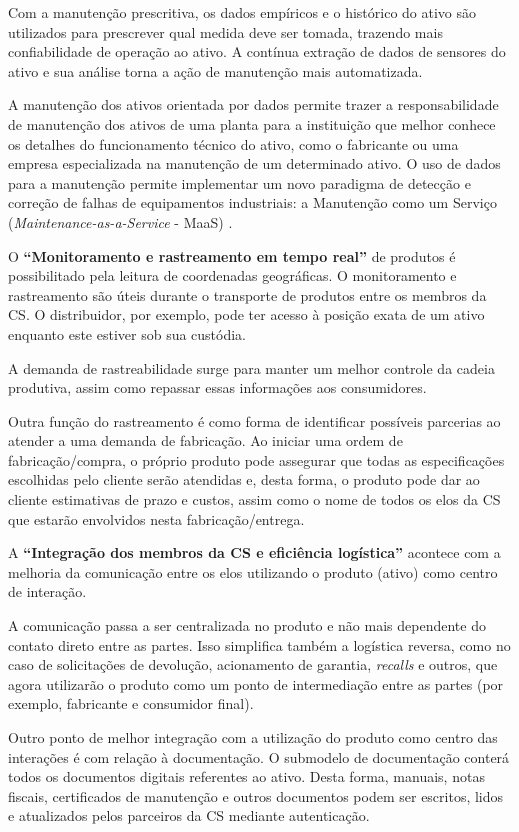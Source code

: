 Com a manutenção prescritiva, os dados empíricos e o histórico do ativo são utilizados para prescrever qual medida deve ser tomada, trazendo mais confiabilidade de operação ao ativo. A contínua extração de dados de sensores do ativo e sua análise torna a ação de manutenção mais automatizada.

A manutenção dos ativos orientada por dados permite trazer a responsabilidade de manutenção dos ativos de uma planta para a instituição que melhor conhece os detalhes do funcionamento técnico do ativo, como o fabricante ou uma empresa especializada na manutenção de um determinado ativo. O uso de dados para a manutenção permite implementar um novo paradigma de detecção e correção de falhas de equipamentos industriais: a Manutenção como um Serviço (\textit{Maintenance-as-a-Service} - MaaS) \cite{zoll2018maas}.

O \textbf{``Monitoramento e rastreamento em tempo real''} de produtos é possibilitado pela leitura de coordenadas geográficas. O monitoramento e rastreamento são úteis durante o transporte de produtos entre os membros da CS. O distribuidor, por exemplo, pode ter acesso à posição exata de um ativo enquanto este estiver sob sua custódia.

A demanda de rastreabilidade surge para manter um melhor controle da cadeia produtiva, assim como repassar essas informações aos consumidores.

Outra função do rastreamento é como forma de identificar possíveis parcerias ao atender a uma demanda de fabricação. Ao iniciar uma ordem de fabricação/compra, o próprio produto pode assegurar que todas as especificações escolhidas pelo cliente serão atendidas e, desta forma, o produto pode dar ao cliente estimativas de prazo e custos, assim como o nome de todos os elos da CS que estarão envolvidos nesta fabricação/entrega.

A \textbf{``Integração dos membros da CS e eficiência logística''} acontece com a melhoria da comunicação entre os elos utilizando o produto (ativo) como centro de interação.

A comunicação passa a ser centralizada no produto e não mais dependente do contato direto entre as partes. Isso simplifica também a logística reversa, como no caso de solicitações de devolução, acionamento de garantia, \textit{recalls} e outros, que agora utilizarão o produto como um ponto de intermediação entre as partes (por exemplo, fabricante e consumidor final).

Outro ponto de melhor integração com a utilização do produto como centro das interações é com relação à documentação. O submodelo de documentação conterá todos os documentos digitais referentes ao ativo. Desta forma, manuais, notas fiscais, certificados de manutenção e outros documentos podem ser escritos, lidos e atualizados pelos parceiros da CS mediante autenticação.

